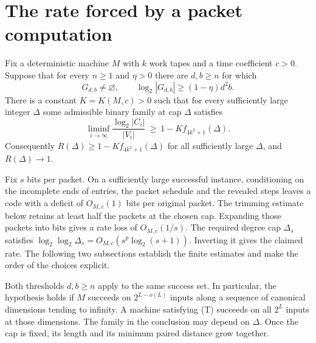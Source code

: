 \section{The rate forced by a packet computation}\label{sec:proof}

\begin{theorem}\label{thm:main}
Fix a deterministic machine $M$ with $k$ work tapes and a time coefficient $c>0$.
Suppose that for every $n\ge1$ and $\eta>0$ there are $d,b\ge n$ for which
\[
  G_{d,b}\ne\varnothing,\qquad
  \log_2|G_{d,b}|\ge(1-\eta)d^2b .
\]
There is a constant $K=K(M,c)>0$ such that for every sufficiently large
integer $\Delta$ some admissible binary family at cap $\Delta$ satisfies
\[
  \liminf_{i\to\infty}\frac{\log_2|C_i|}{|V_i|}
     \ \ge\ 1-K f_{4k^2+1}(\Delta).
\]
Consequently $R(\Delta)\ge1-K f_{4k^2+1}(\Delta)$ for all sufficiently
large $\Delta$, and $R(\Delta)\to1$.
\end{theorem}
\begin{outline}
Fix $s$ bits per packet. On a sufficiently large successful instance,
conditioning on the incomplete ends of entries, the packet schedule and
the revealed steps leaves a code with a deficit of $O_{M,c}(1)$ bits
per original packet. The trimming estimate below retains at least half
the packets at the chosen cap. Expanding those packets into bits gives
a rate loss of $O_{M,c}(1/s)$. The required degree cap $\Delta_s$ satisfies
$\log_2\log_2\Delta_s=O_{M,c}(s^p\log_2(s+1))$. Inverting it gives
the claimed rate. The following two subsections establish the finite
estimates and make the order of the choices explicit.
\end{outline}

Both thresholds $d,b\ge n$ apply to the same success set. In particular,
the hypothesis holds if $M$ succeeds on $2^{L-o(L)}$ inputs along a sequence
of canonical dimensions tending to infinity. A machine satisfying (T)
succeeds on all $2^L$ inputs at those dimensions. The family in the
conclusion may depend on $\Delta$. Once the cap is fixed, its length
and its minimum paired distance grow together.



